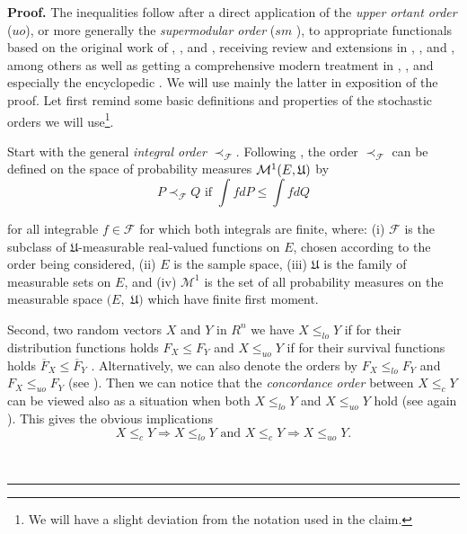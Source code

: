 \documentclass[onecolumn]{article}
\newenvironment{proof}[1][Proof]{\noindent\textbf{#1.} }{\ \rule{0.5em}{0.5em}}
\begin{document}
\begin{proof}
The inequalities follow after a direct application of the \textit{upper
ortant order} ($uo$), or more generally the \textit{supermodular order} ($sm$%
), to appropriate functionals based on the original work of \cite{[34]}, 
\cite{[30]}, and \cite{[13]}, receiving review and extensions in \cite{[29]}%
, \cite{[26]}, and \cite{[31]}, among others as well as getting a
comprehensive modern treatment in \cite[Chapter 9.A.4]{[24]}, \cite[Chapter 6%
]{[33]}, and especially the encyclopedic \cite[Chapter 6]{[5]}. We will use
mainly the latter in exposition of the proof. Let first remind some basic
definitions and properties of the stochastic orders we will use\footnote{%
{\footnotesize We will have a slight deviation from the notation used in the
claim.}}.

Start with the general \textit{integral order} $\prec _{\mathcal{F}}$.
Following \cite[Definition 3.30]{[5]}, the order $\prec _{\mathcal{F}}$ can
be defined on the space of probability measures $\mathcal{M}^{1}(E,\mathfrak{%
U})$ by 
\begin{equation}
P\prec _{\mathcal{F}}Q\text{ if }\int fdP\leq \int fdQ  \label{225.1}
\end{equation}

for all integrable $f\in \mathcal{F}$ for which both integrals are finite,
where: (i) $\mathcal{F}$ is the subclass of $\mathfrak{U}$-measurable
real-valued functions on $\mathit{E}$, chosen according to the order being
considered, (ii) $E$ is the sample space, (iii) $\mathfrak{U}$ is the family
of measurable sets on $E$, and (iv) $\mathcal{M}^{1}$ is the set of all
probability measures on the measurable space $(\mathit{E},$ $\mathfrak{U}$$)$
which have finite first moment.

Second, two random vectors $X$ and $Y$ in $R^{n}$ we have $X\leq _{lo}Y$ if
for their distribution functions holds $F_{X}\leq F_{Y}$ and $X\leq _{uo}Y$
if for their survival functions holds $\overline{F}_{X}\leq \overline{F}_{Y}$%
. Alternatively, we can also denote the orders by $F_{X}\leq _{lo}F_{Y}$ and 
$F_{X}\leq _{uo}F_{Y}$ (see \cite[Definition 6.1]{[5]}). Then we can notice
that the \textit{concordance order} between $X\leq _{c}Y$ can be viewed also
as a situation when both $X\leq _{lo}Y$ and $X\leq _{uo}Y$ hold (see again 
\cite[Definition 6.1]{[5]}). This gives the obvious implications 
\begin{equation}
X\leq _{c}Y\Longrightarrow X\leq _{lo}Y\text{ and }X\leq
_{c}Y\Longrightarrow X\leq _{uo}Y.  \label{225.2}
\end{equation}


\end{proof}
\end{document}

